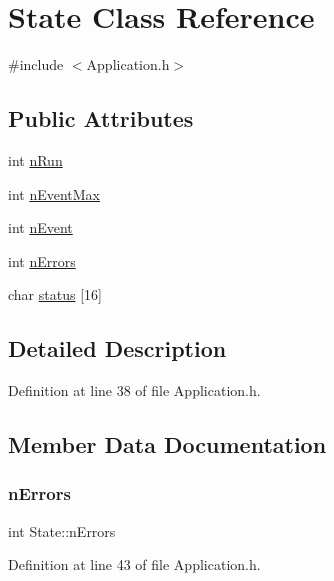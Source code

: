 \hypertarget{classState}{}\section{State Class Reference}
\label{classState}


{\ttfamily \#include $<$Application.\+h$>$}

\subsection*{Public Attributes}
\begin{DoxyCompactItemize}
\item 
int \hyperlink{classState_aa29a124a8d6060a02bd2468480d7bbd3}{n\+Run}
\item 
int \hyperlink{classState_ac57f536cfe9e9819dfc891ed00dabfe3}{n\+Event\+Max}
\item 
int \hyperlink{classState_af9d335bba28d6946043a07b047556690}{n\+Event}
\item 
int \hyperlink{classState_a0dc7f2525107b9b294f50c23da27cc2a}{n\+Errors}
\item 
char \hyperlink{classState_aaec062c78d5602d066a7960a2e08e1cd}{status} \mbox{[}16\mbox{]}
\end{DoxyCompactItemize}


\subsection{Detailed Description}


Definition at line 38 of file Application.\+h.



\subsection{Member Data Documentation}
\mbox{\label{classState_a0dc7f2525107b9b294f50c23da27cc2a}} 
\subsubsection{\texorpdfstring{n\+Errors}{nErrors}}
{\footnotesize\ttfamily int State\+::n\+Errors}



Definition at line 43 of file Application.\+h.



